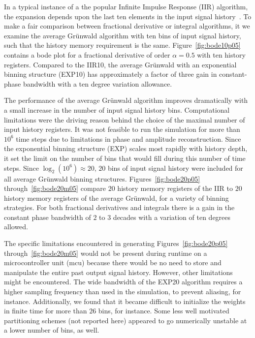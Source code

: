 In a typical instance of a the popular
Infinite Impulse Response (IIR) algorithm, the expansion depends upon the
last ten elements in the input signal history~\cite{Chen:04a}. To make a
fair comparison between fractional derivative or integral algorithms,
it we examine the average Gr{\"u}nwald algorithm with ten bins of input
signal history, such that the history memory requirement is the
same. Figure~\ref{fig:bode10p05} contains a bode plot for a fractional
derivative of order $\alpha=0.5$ with ten history registers. Compared
to the IIR10, the average Gr{\"u}nwald with an exponential binning
structure (EXP10) has approximately a factor of three gain in
constant-phase bandwidth with a ten degree variation allowance. 

The performance of the average Gr{\"u}nwald algorithm improves
dramatically with a small increase in the number of input signal
history bins. Computational limitations were the driving reason behind the choice of the maximal number of input history registers. It was not feasible to run the simulation for more than $10^6$ time steps due to limitations in phase and amplitude reconstruction.  Since the exponential binning structure (EXP) scales most rapidly with history depth, it set the limit on the number of bins that would fill during this number of time steps. Since $\log_2(10^6)\approx 20$, $20$ bins of input signal history were included for all average Gr{\"u}nwald binning structures. Figures~\ref{fig:bode20p05} through~\ref{fig:bode20m05} compare $20$
history memory registers of the IIR to $20$ history memory
registers of the average Gr{\"u}nwald, for a variety of binning
strategies. For both fractional
derivatives and integrals there is a gain in the constant phase
bandwidth of $2$ to $3$ decades with a variation of ten degrees allowed.

The specific limitations encountered in generating Figures~\ref{fig:bode20p05} through~\ref{fig:bode20m05} would not be present during runtime on a microcontroller unit (mcu) because there would be no need to store and manipulate the entire past output signal history. However, other limitations might be encountered. The wide bandwidth of the EXP20 algorithm requires a higher sampling frequency than used in the simulation, to prevent aliasing, for instance. Additionally, we found that it became difficult to initialize the weights in finite time for more than $26$ bins, for instance. Some less well motivated partitioning schemes (not reported here) appeared to go numerically unstable at a lower number of bins, as well. 

